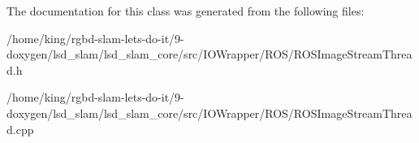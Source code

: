 The documentation for this class was generated from the following files\-:\begin{DoxyCompactItemize}
\item 
/home/king/rgbd-\/slam-\/lets-\/do-\/it/9-\/doxygen/lsd\-\_\-slam/lsd\-\_\-slam\-\_\-core/src/\-I\-O\-Wrapper/\-R\-O\-S/R\-O\-S\-Image\-Stream\-Thread.\-h\item 
/home/king/rgbd-\/slam-\/lets-\/do-\/it/9-\/doxygen/lsd\-\_\-slam/lsd\-\_\-slam\-\_\-core/src/\-I\-O\-Wrapper/\-R\-O\-S/R\-O\-S\-Image\-Stream\-Thread.\-cpp\end{DoxyCompactItemize}
